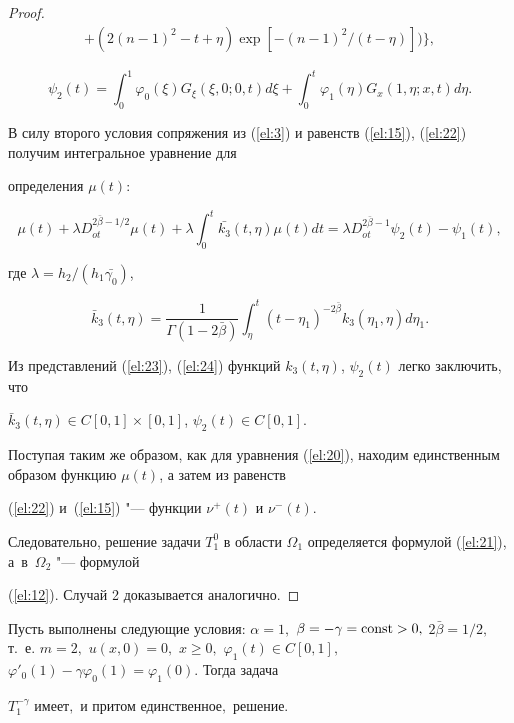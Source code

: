 \begin{proof}
\begin{multline}
+(2(n-1)^2-t+\eta)\exp[-(n-1)^2/(t-\eta)]\bigr)\biggr\},

\end{multline}



\pagebreak



\begin{equation} \label{el:24}

\psi_2(t)=\int_0^1\varphi_0(\xi)G_\xi(\xi, 0;0,t)d\xi+\int_0^t\varphi_1(\eta)G_x(1,\eta;x,t)d\eta.

\end{equation}



В силу второго условия сопряжения из (\ref{el:3}) и равенств (\ref{el:15}), (\ref{el:22}) получим интегральное уравнение для

определения $\mu(t)$:

$$ \mu(t)+\lambda D_{ot}^{2\bar{\beta}-1/2}\mu(t)+\lambda\int_0^t\bar{k_3}(t,\eta)\mu(t)dt=\lambda

D_{ot}^{2\bar{\beta}-1}\psi_2(t)-\psi_1(t),$$

где $\lambda=h_2/(h_1\bar{\gamma_0})$,

$$\bar{k}_3(t,\eta)=\frac{1}{\Gamma(1-2\bar{\beta})}\int_{\eta}^t(t-\eta_1)^{-2\bar{\beta}}k_3(\eta_1,\eta)d\eta_1.$$



Из представлений (\ref{el:23}), (\ref{el:24}) функций $k_3(t,\eta)$, $\psi_2(t)$ легко заключить, что

$\bar{k}_3(t,\eta)\in C[0, 1]\times [0, 1]$, $\psi_2(t)\in C[0, 1]$.



Поступая таким же образом, как для уравнения (\ref{el:20}), находим единственным образом функцию $\mu(t)$, а затем из равенств

(\ref{el:22}) и~(\ref{el:15}) "--- функции $\nu^+(t)$ и $\nu^-(t)$.



Следовательно, решение задачи $T_1^0$ в области $\Omega_1$ определяется формулой (\ref{el:21}), а~в~$\Omega_2$ "--- формулой 

(\ref{el:12}). Случай 2 доказывается аналогично.

\end{proof}



\smallskip



\begin{theorem}[3]Пусть выполнены следующие условия{\rm:} $\alpha=1,$ $\beta=-\gamma={\rm const}>0,$ $2\bar{\beta}=1/2,$ т.~е. $m=2,$ $u(x,0)=0,$ $x\geq0,$ $\varphi_1(t)\in C[0, 1],$ $\varphi'_0(1)-\gamma\varphi_0(1)=\varphi_1(0).$ Тогда задача

$T_1^{-\gamma}$ имеет$,$ и притом единственное$,$ решение\rm.

\end{theorem}



